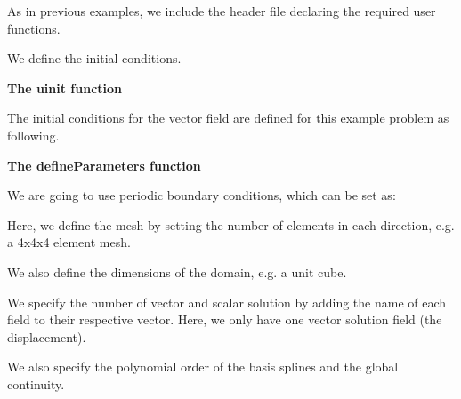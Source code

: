  As in previous examples, we include the header file declaring the required user functions.


\begin{DoxyCodeInclude}

\end{DoxyCodeInclude}


We define the initial conditions.

{\bfseries  The {\ttfamily uinit} function }

The initial conditions for the vector field are defined for this example problem as following.


\begin{DoxyCodeInclude}

\end{DoxyCodeInclude}


{\bfseries  The {\ttfamily define\-Parameters} function }

We are going to use periodic boundary conditions, which can be set as\-:


\begin{DoxyCodeInclude}

\end{DoxyCodeInclude}


Here, we define the mesh by setting the number of elements in each direction, e.\-g. a 4x4x4 element mesh.


\begin{DoxyCodeInclude}

\end{DoxyCodeInclude}


We also define the dimensions of the domain, e.\-g. a unit cube.


\begin{DoxyCodeInclude}

\end{DoxyCodeInclude}


We specify the number of vector and scalar solution by adding the name of each field to their respective vector. Here, we only have one vector solution field (the displacement).


\begin{DoxyCodeInclude}

\end{DoxyCodeInclude}


We also specify the polynomial order of the basis splines and the global continuity.


\begin{DoxyCodeInclude}

\end{DoxyCodeInclude}


